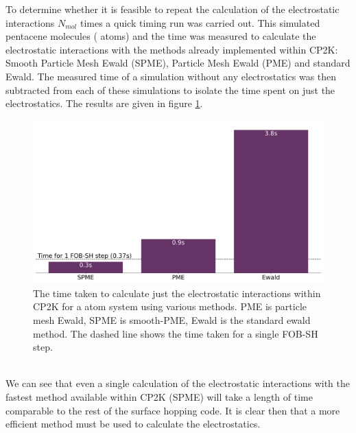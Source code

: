 To determine whether it is feasible to repeat the calculation of the electrostatic interactions $N_{mol}$ times a quick timing run was carried out. This simulated  pentacene molecules ( atoms) and the time was measured to calculate the electrostatic interactions with the  methods already implemented within CP2K: Smooth Particle Mesh Ewald (SPME), Particle Mesh Ewald (PME) and standard Ewald. The measured time of a simulation without any electrostatics was then subtracted from each of these simulations to isolate the time spent on just the electrostatics. The results are given in figure  \ref{fig:ES_Timings}.
\begin{figure}[ht]
  \includegraphics[width=\textwidth]{../img/ES/InitialTimings.png}
	\caption{\label{fig:ES_Timings}The time taken to calculate just the electrostatic interactions within CP2K for a  atom system using various methods. PME is particle mesh Ewald, SPME is smooth-PME, Ewald is the standard ewald method. The dashed line shows the time taken for a single FOB-SH step.}
\end{figure}
\\
We can see that even a single calculation of the electrostatic interactions with the fastest method available within CP2K (SPME) will take a length of time comparable to the rest of the surface hopping code. It is clear then that a more efficient method must be used to calculate the electrostatics.
\\
